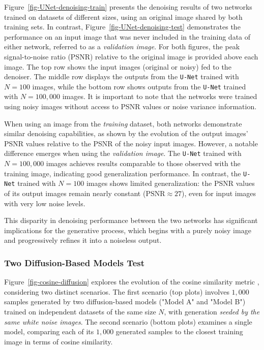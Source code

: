 \documentclass[fleqn,usenatbib]{mnras}
\begin{document}
Figure~\ref{fig-UNet-denoising-train} presents the denoising results of two networks trained on datasets of different sizes, using an original image shared by both training sets. In contrast, Figure~\ref{fig-UNet-denoising-test} demonstrates the performance on an input image that was never included in the training data of either network, referred to as a \textit{validation image}. For both figures, the peak signal-to-noise ratio (PSNR) relative to the original image is provided above each image. The top row shows the input images (original or noisy) fed to the denoiser. The middle row displays the outputs from the \texttt{U-Net} trained with $N=100$ images, while the bottom row shows outputs from the \texttt{U-Net} trained with $N=100,000$ images. It is important to note that the networks were trained using noisy images without access to PSNR values or noise variance information.


When using an image from the \textit{training} dataset, both networks demonstrate similar denoising capabilities, as shown by the evolution of the output images' PSNR values relative to the PSNR of the noisy input images. However, a notable difference emerges when using the \textit{validation image}. The \texttt{U-Net} trained with $N=100,000$ images achieves results comparable to those observed with the training image, indicating good generalization performance. In contrast, the \texttt{U-Net} trained with $N=100$ images shows limited generalization: the PSNR values of its output images remain nearly constant ($\mathrm{PSNR} \approx 27$), even for input images with very low noise levels. 

This disparity in denoising performance between the two networks has significant implications for the generative process, which begins with a purely noisy image and progressively refines it into a noiseless output.
%
\subsubsection{Two Diffusion-Based Models Test}
\label{sec-two_models-Diffusion}
%
Figure~\ref{fig-cosine-diffusion} explores the evolution of the cosine similarity metric \citep{books/aw/TanSK2005}, considering two distinct scenarios. The first scenario (top plots) involves $1,000$ samples generated by two diffusion-based models ("Model A" and "Model B") trained on independent datasets of the same size $N$, with generation \textit{seeded by the same white noise images}. The second scenario (bottom plots) examines a single model, comparing each of its $1,000$ generated samples to the closest training image in terms of cosine similarity.
\end{document}
